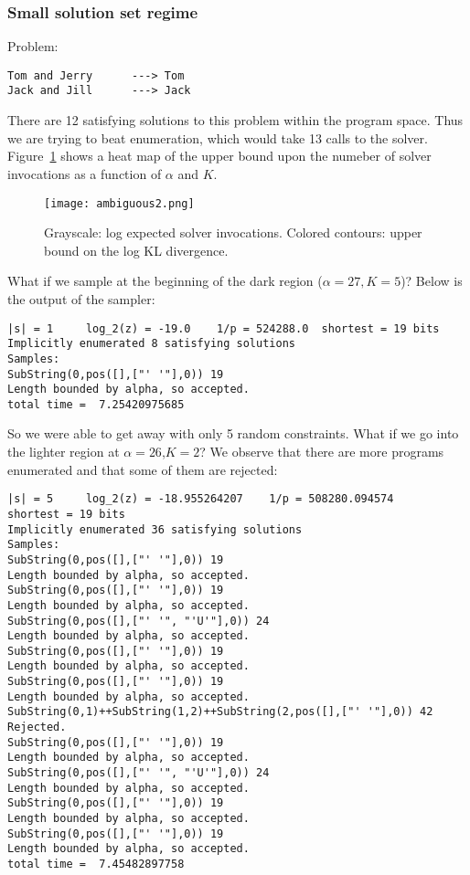 \documentclass{article}
\begin{document}
\subsubsection{Small solution set regime}
Problem:
\begin{verbatim}
Tom and Jerry      ---> Tom
Jack and Jill      ---> Jack
\end{verbatim}
There are 12 satisfying solutions to this problem within the program space.
Thus we are trying to beat enumeration, which would take 13 calls to the solver.
Figure~\ref{ambiguous2} shows a heat map of the upper bound upon the numeber of solver invocations as a function of $\alpha$ and $K$.
\begin{figure}\label{ambiguous2}
  \texttt{[image: ambiguous2.png]}
  \caption{Grayscale: log expected solver invocations. Colored contours: upper bound on the log KL divergence. }
\end{figure}
What if we sample at the beginning of the dark region ($\alpha = 27,K = 5$)? Below is the output of the sampler:
\begin{verbatim}
|s| = 1 	log_2(z) = -19.0 	1/p = 524288.0 	shortest = 19 bits
Implicitly enumerated 8 satisfying solutions
Samples:
SubString(0,pos([],["' '"],0)) 19
Length bounded by alpha, so accepted.
total time =  7.25420975685
\end{verbatim}
So we were able to get away with only 5 random constraints. What if we go into the lighter region at $\alpha = 26$,$K = 2$? We observe that there are more programs enumerated and that some of them are rejected:
\begin{verbatim}
|s| = 5 	log_2(z) = -18.955264207 	1/p = 508280.094574 	shortest = 19 bits
Implicitly enumerated 36 satisfying solutions
Samples:
SubString(0,pos([],["' '"],0)) 19
Length bounded by alpha, so accepted.
SubString(0,pos([],["' '"],0)) 19
Length bounded by alpha, so accepted.
SubString(0,pos([],["' '", "'U'"],0)) 24
Length bounded by alpha, so accepted.
SubString(0,pos([],["' '"],0)) 19
Length bounded by alpha, so accepted.
SubString(0,pos([],["' '"],0)) 19
Length bounded by alpha, so accepted.
SubString(0,1)++SubString(1,2)++SubString(2,pos([],["' '"],0)) 42
Rejected.
SubString(0,pos([],["' '"],0)) 19
Length bounded by alpha, so accepted.
SubString(0,pos([],["' '", "'U'"],0)) 24
Length bounded by alpha, so accepted.
SubString(0,pos([],["' '"],0)) 19
Length bounded by alpha, so accepted.
SubString(0,pos([],["' '"],0)) 19
Length bounded by alpha, so accepted.
total time =  7.45482897758
\end{verbatim}
\end{document}

